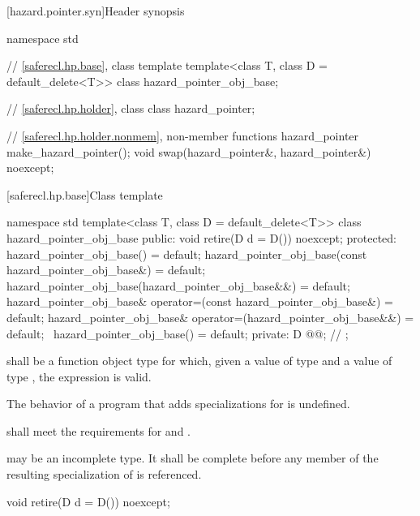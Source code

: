 [hazard.pointer.syn]{Header  synopsis}

%
\begin{codeblock}
namespace std {
  // \ref{saferecl.hp.base}, class template 
  template<class T, class D = default_delete<T>> class hazard_pointer_obj_base;

  // \ref{saferecl.hp.holder}, class 
  class hazard_pointer;

  // \ref{saferecl.hp.holder.nonmem}, non-member functions
  hazard_pointer make_hazard_pointer();
  void swap(hazard_pointer&, hazard_pointer&) noexcept;
}
\end{codeblock}

[saferecl.hp.base]{Class template }

\begin{codeblock}
namespace std {
  template<class T, class D = default_delete<T>>
  class hazard_pointer_obj_base {
  public:
    void retire(D d = D()) noexcept;
  protected:
    hazard_pointer_obj_base() = default;
    hazard_pointer_obj_base(const hazard_pointer_obj_base&) = default;
    hazard_pointer_obj_base(hazard_pointer_obj_base&&) = default;
    hazard_pointer_obj_base& operator=(const hazard_pointer_obj_base&) = default;
    hazard_pointer_obj_base& operator=(hazard_pointer_obj_base&&) = default;
    ~hazard_pointer_obj_base() = default;
  private:
    D @@;      // \expos
  };
}
\end{codeblock}

\pnum
{} shall be a function object type
for which, given a value  of type  and
a value  of type ,
the expression  is valid.

\pnum
The behavior of a program
that adds specializations for  is undefined.

\pnum
{} shall meet the requirements for
 and .

\pnum
{} may be an incomplete type.
It shall be complete before any member
of the resulting specialization of 
is referenced.

%
\begin{itemdecl}
void retire(D d = D()) noexcept;
\end{itemdecl}

